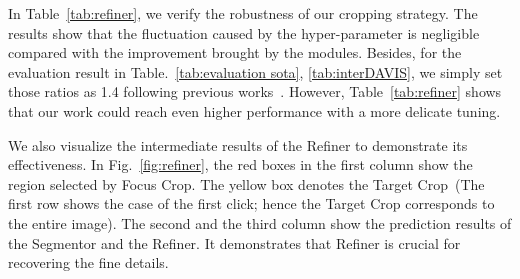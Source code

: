 \documentclass[10pt,twocolumn,letterpaper]{article}
\begin{document}
In Table~\ref{tab:refiner}, we verify the robustness of our cropping strategy. The results show that the fluctuation caused by the hyper-parameter is negligible compared with the improvement brought by the modules. Besides, for the evaluation result in Table.~\ref{tab:evaluation sota}, \ref{tab:interDAVIS},  we simply set those ratios as 1.4 following previous works~\cite{fbrs,sofiiuk2021ritm,chen2021cdnet}. However, Table~\ref{tab:refiner} shows that our work could reach even higher performance with a more delicate tuning.


We also visualize the intermediate results of the Refiner to demonstrate its effectiveness. In Fig.~\ref{fig:refiner}, the red boxes in the first column show the region selected by Focus Crop. The yellow box denotes the Target Crop~(The first row shows the case of the first click; hence the Target Crop corresponds to the entire image).
The second and the third column show the prediction results of the Segmentor and the Refiner. It demonstrates that Refiner is crucial for recovering the fine details. 

\begin{comment}
\begin{table}[t]
\small
\begin{center}
\scalebox{0.8}{
\begin{tabular}{ll|c|c|c|c|c|c}
\toprule[1pt]
\multicolumn{2}{l|}{} & \multicolumn{3}{c|}{DAVIS} & \multicolumn{3}{c}{DAVIS-585}   \\
\cline{3-8}

\multicolumn{2}{l|}{Method } & NoC85 & NoC90 &  NoF90 & NoC85 & NoC90  & NoF90 \\
\hline

\multicolumn{2}{l|}{FC~(r=1.2)} &  5.16 & 7.50 & 66 & 2.58 & 3.75 & 57  \\
\multicolumn{2}{l|}{FC~(r=1.4)} &  5.13 & 7.42 & 64 & 2.63 & 3.69 & 54  \\
\multicolumn{2}{l|}{FC~(r=1.6)} &  5.08 & 7.31 & 62 & 2.66 & 3.74 & 55  \\
\multicolumn{2}{l|}{Object Crop} &  5.08 & 7.49 & 70 & 2.55 & 3.81 & 53  \\
\multicolumn{2}{l|}{Click Crop} &  5.26 & 7.66 & 61 & 2.75 & 3.85 & 58  \\
\bottomrule[1pt]
\end{tabular}
}
\end{center}
\vspace{-5mm}
\caption{ Comparison results for different cropping strategies for the Refiner. `FC' denotes our Focus Crop strategy. `r' stands for the expand ratio. `Object Crop' and `Click Crop' are two other strategies that make crops around the object and the last click.    }
\label{tab:refiner}
\vspace{-4mm}
\end{table}
\end{comment}
\end{document}
